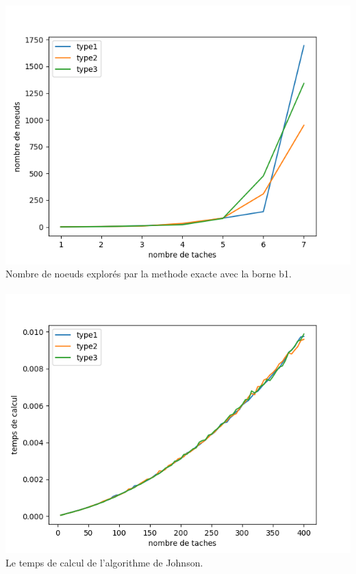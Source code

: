 \documentclass[a4paper, 10pt]{article}
\begin{document}
                \paragraph{}{
                  \includegraphics{graphes/node_b1.png}
                  Nombre de noeuds explorés par la methode exacte avec la borne b1.
                }

                \paragraph{}{
                  \includegraphics{graphes/Johnson.png}
                  Le temps de calcul de l'algorithme de Johnson.
                  }
                  
\end{document}
